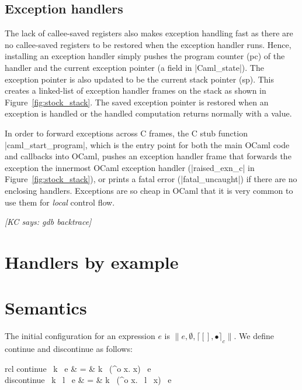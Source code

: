 \documentclass[sigplan,10pt,review,anonymous]{acmart}\settopmatter{printfolios=true,printccs=false,printacmref=false}
\newenvironment{nop}{}{}
\newenvironment{smathpar}{
\begin{nop}\small\begin{mathpar}}{
\end{mathpar}\end{nop}\ignorespacesafterend}
\newcommand{\kc}[1]{{\color{red} {\it [KC says: #1]}}}
\newcommand{\olam}[2]{\lambda^o #1. #2}
\newcommand{\kw}[1]{\text{\bf #1}}
\newcommand{\throw}[2]{\kw{raise} ~#1 ~#2}
\newcommand{\cstacka}[2]{\big \lceil #1, #2 \big \rceil_c} %
\newcommand{\configa}[3]{\|#1,#2,#3\|}
\begin{document}
\subsection{Exception handlers}

The lack of callee-saved registers also makes exception handling fast as there
are no callee-saved registers to be restored when the exception handler runs.
Hence, installing an exception handler simply pushes the program counter (pc)
of the handler and the current exception pointer (a field in |Caml_state|). The
exception pointer is also updated to be the current stack pointer (sp). This
creates a linked-list of exception handler frames on the stack as shown in
Figure~\ref{fig:stock_stack}. The saved exception pointer is restored when an
exception is handled or the handled computation returns normally with a value.

In order to forward exceptions across C frames, the C stub function
|caml_start_program|, which is the entry point for both the main OCaml code and
callbacks into OCaml, pushes an exception handler frame that forwards the
exception the innermost OCaml exception handler (|raised_exn_c| in
Figure~\ref{fig:stock_stack}), or prints a fatal error (|fatal_uncaught|) if there
are no enclosing handlers. Exceptions are so cheap in OCaml that it is very
common to use them for \emph{local} control flow.

\kc{gdb backtrace}

\section{Handlers by example}
\label{sec:handlers}

\section{Semantics}
\label{sec:semantics}

The initial configuration for an expression $e$ is
$\configa{e}{\emptyset}{\cstacka{[]}{\bullet}}$. We define {\sf continue} and
{\sf discontinue} as follows:

\begin{smathpar}
	\begin{array}{rcl}
		\textsf{continue} ~k ~e & = & k ~(\olam{x}{x}) ~e \\
		\textsf{discontinue} ~k ~l ~e & = & k ~(\olam{x}{\throw{l}{x}}) ~e
	\end{array}
\end{smathpar}
\end{document}
